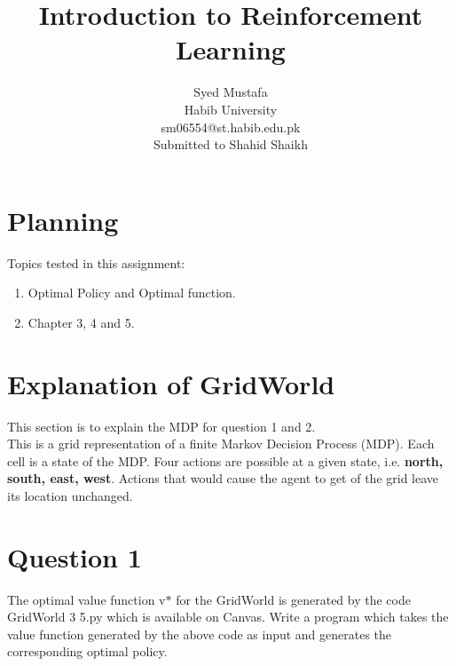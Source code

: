 \documentclass[11pt]{article}
\newcommand{\Submitted}[1]{Submitted to #1}
\begin{document}
\title{Introduction to Reinforcement Learning }


\author{Syed Mustafa \\ Habib University\\ sm06554@st.habib.edu.pk\\\Submitted{Shahid Shaikh}}

\maketitle

\section{Planning}
Topics tested in this assignment:
\begin{enumerate}
    \item Optimal Policy and Optimal function.
    \item Chapter 3, 4 and 5. 
\end{enumerate}

\section*{Explanation of GridWorld}
This section is to explain the MDP for question 1 and 2.\\
This is a grid representation of a finite Markov Decision Process (MDP). Each cell
is a state of the MDP. Four actions are possible at a given state, i.e. \textbf{north, south,
east, west}. Actions that would cause the agent to get of the grid leave its location unchanged.
\newpage
\section*{Question 1}
The optimal value function v\(*\) for the GridWorld is generated by the code GridWorld 3 5.py
which is available on Canvas. Write a program which takes the value function generated by
the above code as input and generates the corresponding optimal policy.
\end{document}
